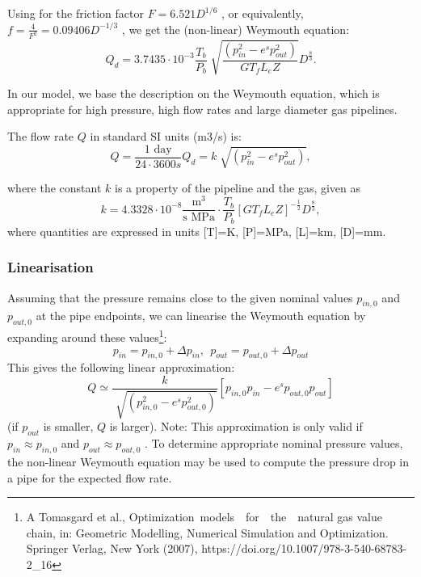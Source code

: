 \documentclass[12pt]{article}
\begin{document}
Using for the friction factor  \( F=6.521D^{1/6} \) , or equivalently,  \( f=\frac{4}{F^{2}}=0.09406 D^{-1/3} \) , we get the (non-linear) Weymouth equation:
\begin{equation}
	 Q_{d}=3.7435 \cdot 10^{-3}\frac{T_{b}}{P_{b}}\sqrt[]{\frac{ \left( p_{in}^{2}-e^{s}p_{out}^{2} \right) }{GT_{f}L_{e}Z}}D^{\frac{8}{3}}. 
\end{equation} 


In our model, we base the description on the Weymouth equation, which is appropriate for high pressure, high flow rates and large diameter gas pipelines. 


The flow rate  \( Q \)  in standard SI units (m3/s) is:
\begin{equation}
 	 Q=\frac{\text{1 day}}{24 \cdot 3600 s}Q_{d}=k\sqrt[]{ \left( p_{in}^{2}-e^{s}p_{out}^{2} \right) }, 
\end{equation} 




where the constant  \( k \)  is a property of the pipeline and the gas, given as 
\begin{equation}
 	k=4.3328 \cdot 10^{-8}\frac{\mathrm{m}^{\mathrm{3}}}{\mathrm{\text{s MPa}}} \cdot  \frac{T_{b}}{P_{b}} \left[ GT_{f}L_{e}Z \right] ^{-\frac{1}{2}}D^{\frac{8}{3}}, 
\end{equation}
%
where quantities are expressed in units [T]=K, [P]=MPa, [L]=km, [D]=mm. 

\subsubsection{Linearisation}

Assuming that the pressure remains close to the given nominal values  \( p_{in,0}^{} \)  and  \( p_{out,0}^{} \)  at the pipe endpoints, we can linearise the Weymouth equation by expanding around these values\footnote{ A Tomasgard et al., Optimization\  models\ \ for\ \ the\ \ natural  gas  value  chain, in: Geometric Modelling, Numerical Simulation and Optimization. Springer Verlag, New York (2007), https://doi.org/10.1007/978-3-540-68783-2\_16  }:
\begin{equation}
 	 p_{in}=p_{in,0}^{}+ \Delta p_{in},~~p_{out}=p_{out,0}^{}+ \Delta p_{out}
\end{equation}
%
This gives the following linear approximation:
\begin{equation}
	Q\simeq\frac{k}{\sqrt[]{ \left( p_{in,0}^{2}-e^{s}p_{out,0}^{2} \right) }} \left[ p_{in,0}p_{in}-e^{s}p_{out,0}p_{out} \right] 
\end{equation}
(if  $p_{out}$ is smaller, $Q$ is larger). 
Note: This approximation is only valid if  \( p_{in} \approx p_{in,0}^{} \)  and  \( p_{out} \approx p_{out,0}^{} \) .
To determine appropriate nominal pressure values, the non-linear Weymouth equation may be used to compute the pressure drop in a pipe for the expected flow rate.
\end{document}
